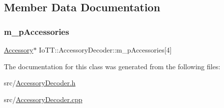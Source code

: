\subsection{Member Data Documentation}
\mbox{\label{classIoTT_1_1AccessoryDecoder_ac8008ef7c48ab2aa422b893d7fc2fd5b}} 
\subsubsection{\texorpdfstring{m\+\_\+p\+Accessories}{m\_pAccessories}}
{\footnotesize\ttfamily \hyperlink{classIoTT_1_1Accessory}{Accessory}$\ast$ Io\+T\+T\+::\+Accessory\+Decoder\+::m\+\_\+p\+Accessories\mbox{[}4\mbox{]}\hspace{0.3cm}{\ttfamily [protected]}}



The documentation for this class was generated from the following files\+:\begin{DoxyCompactItemize}
\item 
src/\hyperlink{AccessoryDecoder_8h}{Accessory\+Decoder.\+h}\item 
src/\hyperlink{AccessoryDecoder_8cpp}{Accessory\+Decoder.\+cpp}\end{DoxyCompactItemize}
